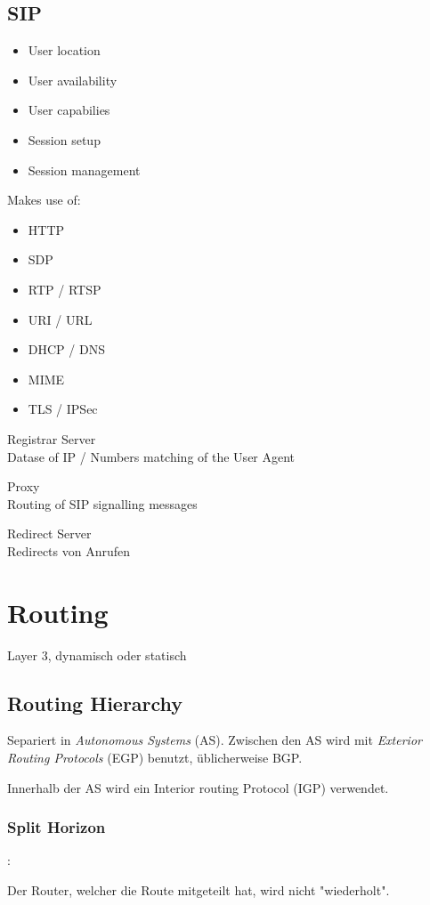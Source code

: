 \subsection{SIP}

\begin{itemize}
	\item User location
	\item User availability
	\item User capabilies
	\item Session setup
	\item Session management
\end{itemize}

Makes use of:
\begin{itemize}
	\item HTTP
	\item SDP
	\item RTP / RTSP
	\item URI / URL
	\item DHCP / DNS
	\item MIME
	\item TLS / IPSec
\end{itemize}

\begin{description}
	\item Registrar Server \hfill \\
		Datase of IP / Numbers matching of the User Agent
	\item Proxy \hfill \\
		Routing of SIP signalling messages
	\item Redirect Server \hfill \\
		Redirects von Anrufen
\end{description}

\section{Routing}

Layer 3, dynamisch oder statisch

\subsection{Routing Hierarchy}

Separiert in \emph{Autonomous Systems} (AS). Zwischen den AS wird mit \emph{Exterior Routing Protocols} (EGP) benutzt, üblicherweise BGP.

Innerhalb der AS wird ein Interior routing Protocol (IGP) verwendet.

\subsubsection{Split Horizon}:

Der Router, welcher die Route mitgeteilt hat, wird nicht "wiederholt".

